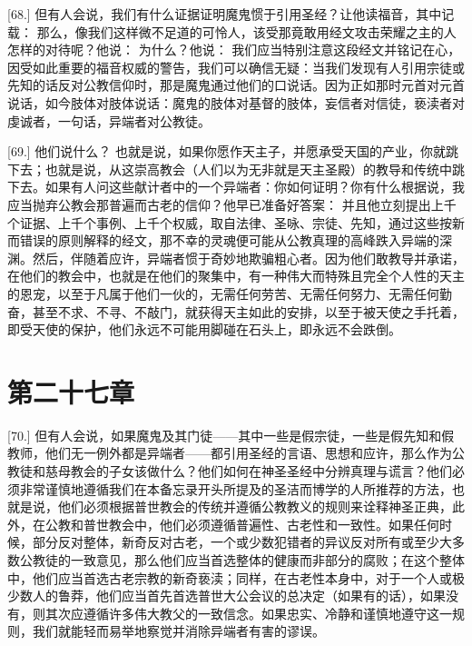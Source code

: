 \par

[68.] 但有人会说，我们有什么证据证明魔鬼惯于引用圣经？让他读福音，其中记载： 那么，像我们这样微不足道的可怜人，该受那竟敢用经文攻击荣耀之主的人怎样的对待呢？他说： 为什么？他说： 我们应当特别注意这段经文并铭记在心，因受如此重要的福音权威的警告，我们可以确信无疑：当我们发现有人引用宗徒或先知的话反对公教信仰时，那是魔鬼通过他们的口说话。因为正如那时元首对元首说话，如今肢体对肢体说话：魔鬼的肢体对基督的肢体，妄信者对信徒，亵渎者对虔诚者，一句话，异端者对公教徒。\par

[69.] 他们说什么？ 也就是说，如果你愿作天主子，并愿承受天国的产业，你就跳下去；也就是说，从这崇高教会（人们以为无非就是天主圣殿）的教导和传统中跳下去。如果有人问这些献计者中的一个异端者：你如何证明？你有什么根据说，我应当抛弃公教会那普遍而古老的信仰？他早已准备好答案： 并且他立刻提出上千个证据、上千个事例、上千个权威，取自法律、圣咏、宗徒、先知，通过这些按新而错误的原则解释的经文，那不幸的灵魂便可能从公教真理的高峰跌入异端的深渊。然后，伴随着应许，异端者惯于奇妙地欺骗粗心者。因为他们敢教导并承诺，在他们的教会中，也就是在他们的聚集中，有一种伟大而特殊且完全个人性的天主的恩宠，以至于凡属于他们一伙的，无需任何劳苦、无需任何努力、无需任何勤奋，甚至不求、不寻、不敲门，就获得天主如此的安排，以至于被天使之手托着，即受天使的保护，他们永远不可能用脚碰在石头上，即永远不会跌倒。\par


\section{第二十七章}

\par

[70.] 但有人会说，如果魔鬼及其门徒——其中一些是假宗徒，一些是假先知和假教师，他们无一例外都是异端者——都引用圣经的言语、思想和应许，那么作为公教徒和慈母教会的子女该做什么？他们如何在神圣圣经中分辨真理与谎言？他们必须非常谨慎地遵循我们在本备忘录开头所提及的圣洁而博学的人所推荐的方法，也就是说，他们必须根据普世教会的传统并遵循公教教义的规则来诠释神圣正典，此外，在公教和普世教会中，他们必须遵循普遍性、古老性和一致性。如果任何时候，部分反对整体，新奇反对古老，一个或少数犯错者的异议反对所有或至少大多数公教徒的一致意见，那么他们应当首选整体的健康而非部分的腐败；在这个整体中，他们应当首选古老宗教的新奇亵渎；同样，在古老性本身中，对于一个人或极少数人的鲁莽，他们应当首先首选普世大公会议的总决定（如果有的话），如果没有，则其次应遵循许多伟大教父的一致信念。如果忠实、冷静和谨慎地遵守这一规则，我们就能轻而易举地察觉并消除异端者有害的谬误。\par

